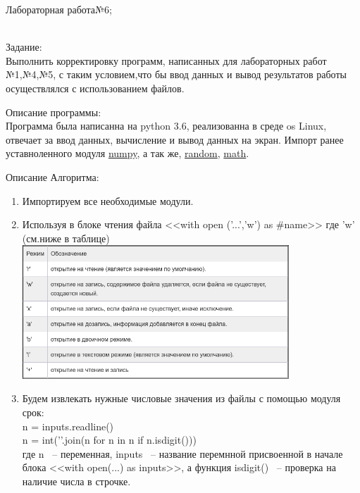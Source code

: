 \documentclass[a4paper]{article}
\begin{document}
\newpage
Лабораторная работа№6;
\\
    \begin{lab1}
        \begin{center}\underline{\hspace{6cm}}\\
            Задание:\\
        \hspace{1cm}Выполнить корректировку программ, написанных для лабораторных работ №1,№4,№5, с таким условием,что бы ввод данных и вывод результатов работы осуществлялся с использованием файлов.
        \end{center}
    \begin{description}
        Описание программы:\\
        \small{Программа была написанна на python 3.6, реализованна в среде os Linux, отвечает за ввод данных, вычисление и вывод данных на экран. Импорт ранее уставноленного модуля \underline{numpy}, а так же, \underline{random}, \underline{math}.}
    \end{description}
    \begin{algoritm}
        Описание Алгоритма:
        \small\begin{enumerate}
            \item Импортируем все необходимые модули.
            \item Используя в блоке чтения файла <<with open ('...','w') as #name>> где 'w' (см.ниже в таблице)\\
            \includegraphics[width=100mm,scale=0.5]{open_func.png}
            \item Будем извлекать нужные числовые значения из файлы с помощью модуля срок:\\
            n = inputs.readline()\\
            n = int(’’.join(n for n in n if n.isdigit()))\\
            где n ~-- переменная, inputs ~-- название перемнной присвоенной в начале блока <<with open(...) as inputs>>, а функция isdigit() ~-- проверка на наличие числа в строчке.

\end{enumerate}
\end{algoritm}
\end{lab1}
\end{document}
